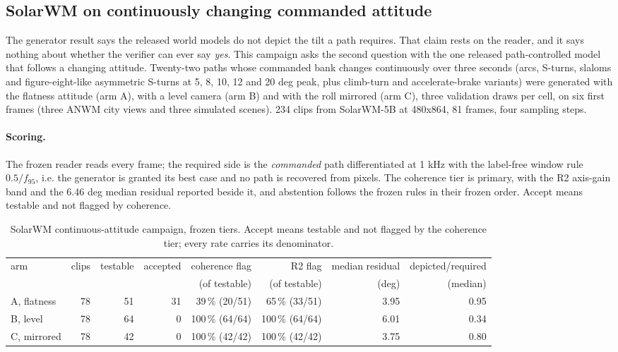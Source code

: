 
\subsection{SolarWM on continuously changing commanded attitude}
\label{sec:h04-solarwm-continuous}

The generator result says the released world models do not depict the tilt a path requires.
That claim rests on the reader, and it says nothing about whether the verifier can ever say
\emph{yes}.  This campaign asks the second question with the one released path-controlled model
that follows a changing attitude.  Twenty-two paths whose commanded bank changes continuously
over three seconds (arcs, S-turns, slaloms and figure-eight-like asymmetric S-turns at 5, 8, 10,
12 and 20 deg peak, plus climb-turn and accelerate-brake variants) were generated with the
flatness attitude (arm A), with a level camera (arm B) and with the roll mirrored (arm C),
three validation draws per cell, on six first frames (three ANWM city views and three
simulated scenes).  234 clips from SolarWM-5B at 480x864, 81 frames, four sampling steps.

\paragraph{Scoring.}
The frozen reader reads every frame; the required side is the \emph{commanded} path
differentiated at 1 kHz with the label-free window rule $0.5/f_{95}$, i.e. the generator is
granted its best case and no path is recovered from pixels.  The coherence tier is primary,
with the R2 axis-gain band and the 6.46 deg median residual reported beside it, and abstention
follows the frozen rules in their frozen order.  Accept means testable and not flagged by
coherence.

\begin{table}[t]
\footnotesize
\begin{tabular}{lrrrrrrr}
\toprule
arm & clips & testable & accepted & coherence flag & R2 flag & median residual & depicted/required \\
 & & & & (of testable) & (of testable) & (deg) & (median) \\
\midrule
A, flatness & 78 & 51 & 31 & 39\,\% (20/51) & 65\,\% (33/51) & 3.95 & 0.95 \\
B, level & 78 & 64 & 0 & 100\,\% (64/64) & 100\,\% (64/64) & 6.01 & 0.34 \\
C, mirrored & 78 & 42 & 0 & 100\,\% (42/42) & 100\,\% (42/42) & 3.75 & 0.80 \\
\bottomrule
\end{tabular}
\caption{SolarWM continuous-attitude campaign, frozen tiers.  Accept means testable and not flagged by the coherence tier; every rate carries its denominator.}
\label{tab:h04-arms}
\end{table}

